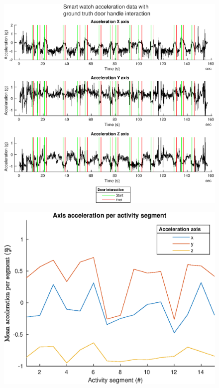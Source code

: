 \begin{figure}[H]
	\centering
	\includegraphics[width=0.7\linewidth]{images/20201114_1820_smartwatch_acc_with_gt_door_and_door_detect_1}
	\caption{}
	\label{fig:202011141820smartwatchaccwithgtdooranddoordetect1}
\end{figure}

\begin{figure}[H]
	\centering
	\includegraphics[width=0.7\linewidth]{images/20201114_1858_Axis_acceleration_per_activity_segment}
	\caption{}
	\label{fig:202011141858axisaccelerationperactivitysegment}
\end{figure}

